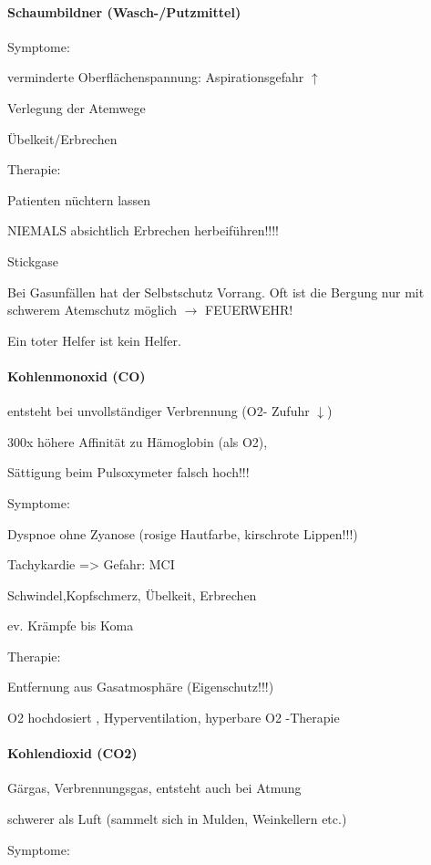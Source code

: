 \documentclass{article}
\begin{document}
\paragraph[Schaumbildner (Wasch-/Putzmittel)]{Schaumbildner
(Wasch-/Putzmittel)}
Symptome:

verminderte Oberfl\"achenspannung:  Aspirationsgefahr ${\uparrow}$

Verlegung der Atemwege

\"Ubelkeit/Erbrechen

Therapie:

Patienten n\"uchtern lassen

NIEMALS absichtlich Erbrechen  herbeif\"uhren!!!!

Stickgase

Bei Gasunf\"allen hat der Selbstschutz Vorrang. Oft ist die Bergung nur
mit schwerem Atemschutz m\"oglich ${\rightarrow}$ FEUERWEHR!

Ein toter Helfer ist kein Helfer.

\paragraph{Kohlenmonoxid (CO)}
entsteht bei unvollst\"andiger Verbrennung (O2- Zufuhr ${\downarrow}$)

300x h\"ohere Affinit\"at zu H\"amoglobin (als O2), 

S\"attigung beim Pulsoxymeter falsch hoch!!!

Symptome:

Dyspnoe  ohne  Zyanose  (rosige Hautfarbe, kirschrote Lippen!!!)

Tachykardie ={\textgreater} Gefahr: MCI

Schwindel,Kopfschmerz, \"Ubelkeit, Erbrechen

ev. Kr\"ampfe bis Koma

Therapie:

Entfernung aus Gasatmosph\"are  (Eigenschutz!!!)

O2 hochdosiert , Hyperventilation, hyperbare  O2 -Therapie

\paragraph[Kohlendioxid (CO2) ]{Kohlendioxid (CO2) }
G\"argas, Verbrennungsgas, entsteht auch bei  Atmung

schwerer als Luft (sammelt sich in Mulden,  Weinkellern etc.)

Symptome:
\end{document}
